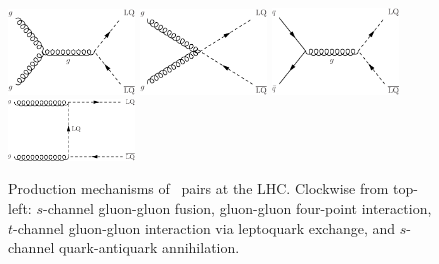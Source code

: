\begin{figure}[H]
    \centering
    \includegraphics[width=0.3\textwidth]{Images/LQLQProduction_1.pdf}\hspace{0.1\textwidth}
    \includegraphics[width=0.3\textwidth]{Images/LQLQProduction_3.pdf}\vspace{0.05\textwidth}
    \includegraphics[width=0.3\textwidth]{Images/LQLQProduction_2.pdf}\hspace{0.1\textwidth}
    \includegraphics[width=0.3\textwidth]{Images/LQLQProduction_4.pdf}\vspace{0.05\textwidth}
    \caption{Production mechanisms of \LQ\LQbar~pairs at the LHC. Clockwise from top-left: $s$-channel gluon-gluon fusion, gluon-gluon four-point interaction, $t$-channel gluon-gluon interaction via leptoquark exchange, and $s$-channel quark-antiquark annihilation.}
    \label{fig:LQpairprod}
\end{figure}